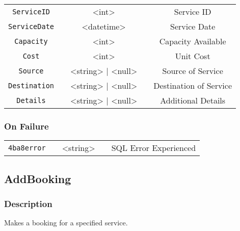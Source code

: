 \documentclass[a4paper,12pt]{article}
\begin{document}
\begin{tabular}{ccccc}
\verb!ServiceID! & \vspace{15mm} & <int> & \vspace{15mm} & Service ID \\
\verb!ServiceDate! & \vspace{15mm} & <datetime> & \vspace{15mm} & Service Date \\
\verb!Capacity! & \vspace{15mm} & <int> & \vspace{15mm} & Capacity Available \\
\verb!Cost! & \vspace{15mm} & <int> & \vspace{15mm} & Unit Cost \\
\verb!Source! & \vspace{15mm} & <string> | <null> & \vspace{15mm} & Source of Service \\
\verb!Destination! & \vspace{15mm} & <string> | <null> & \vspace{15mm} & Destination of Service \\
\verb!Details! & \vspace{15mm} & <string> | <null> & \vspace{15mm} & Additional Details \\
\end{tabular}
\subsubsection{On Failure}

\begin{tabular}{ccccc}
\verb!4ba8error! & \vspace{15mm} & <string> & \vspace{15mm} & SQL Error Experienced \\
\end{tabular}


\subsection{AddBooking}

\subsubsection{Description}

Makes a booking for a specified service.
\end{document}
